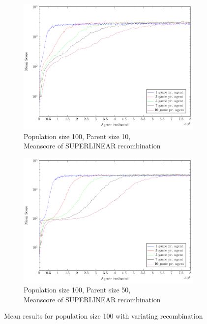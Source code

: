 \begin{figure}
\begin{subfigure}[b]{0.45\textwidth}
    \end{subfigure}
    \begin{subfigure}[b]{0.45\textwidth}
    	\centering
    	\caption{Population size 100, Parent size 10, \\ Meanscore of SUPERLINEAR recombination}
        \includegraphics[width=\textwidth]{data/cma_population_offspring/100x_split/superlinear_l100_o10/mean/PlotFile.pdf}
    \end{subfigure}
    \begin{subfigure}[b]{0.45\textwidth}
    	\centering
    	\caption{Population size 100, Parent size 50, \\ Meanscore of SUPERLINEAR recombination}
        \includegraphics[width=\textwidth]{data/cma_population_offspring/100x_split/superlinear_l100_o50/mean/PlotFile.pdf}
    \end{subfigure}
    
    \caption{Mean results for population size 100 with variating recombination}
\end{figure}

